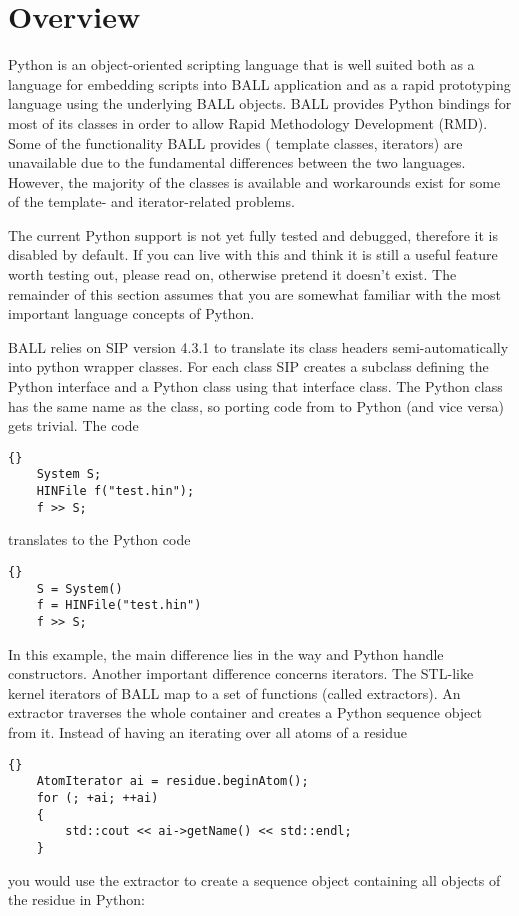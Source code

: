 \section{Overview}
Python is an object-oriented scripting language\cite{Python} that is well
suited both as a language for embedding scripts into BALL application and as a
rapid prototyping language using the underlying BALL objects.
BALL provides Python bindings for most of its classes in order to allow Rapid
Methodology Development (RMD). Some of the functionality BALL provides (\eg
template classes, iterators) are unavailable due to the fundamental differences 
between the two languages. However, the majority of the classes is available and
workarounds exist for some of the template- and iterator-related problems.

The current Python support is not yet fully tested and debugged, therefore it
is disabled by default. If you can live with
this and think it is still a useful feature worth testing out, please read on,
otherwise pretend it doesn't exist. The remainder of this section assumes that
you are somewhat familiar with the most important language concepts of Python.

BALL relies on SIP \cite{SIP} version 4.3.1 to translate its class
headers semi-automatically into python wrapper classes. For each \CPP class
SIP creates a subclass defining the Python interface and a Python class
using that \CPP interface class. The Python class has the same name as the
\CPP class, so porting code from \CPP to Python (and vice versa) gets trivial.
The \CPP code 

\begin{lstlisting}{}
	System S;
	HINFile f("test.hin");
	f >> S;
\end{lstlisting}

\noindent
translates to the Python code

\begin{lstlisting}{}
	S = System()
	f = HINFile("test.hin")
	f >> S;
\end{lstlisting}

\noindent
In this example, the main difference lies in the way \CPP and Python handle
constructors. Another important difference concerns iterators. The STL-like
kernel iterators of BALL map to a set of functions (called extractors). An
extractor traverses the whole container and creates a Python sequence object
from it. Instead of having an  iterating over all atoms of
a residue

\begin{lstlisting}{}
	AtomIterator ai = residue.beginAtom();
	for (; +ai; ++ai)
	{
		std::cout << ai->getName() << std::endl;
	}
\end{lstlisting}
\noindent you would use the  extractor to create a sequence
object containing all objects of the residue in Python:

